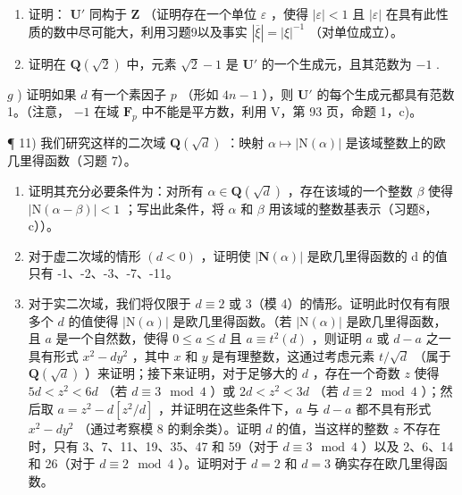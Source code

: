 \begin{enumerate}
\def\labelenumi{\alph{enumi})}
\setcounter{enumi}{4}
\item
  证明： \(\mathbf{U}'\) 同构于 \(\mathbf{Z}\) （证明存在一个单位 \(\varepsilon\) ，使得 \(|\varepsilon| < 1\) 且 \(|\varepsilon|\) 在具有此性质的数中尽可能大，利用习题9以及事实 \(|\overline{\xi}| = |\xi|^{-1}\) （对单位成立）。
\item
  证明在 \(\mathbf{Q}(\sqrt{2})\) 中，元素 \(\sqrt{2} - 1\) 是 \(\mathbf{U}'\) 的一个生成元，且其范数为 \(-1\) .
\end{enumerate}

\(g\) ) 证明如果 \(d\) 有一个素因子 \(p\) （形如 \(4n - 1\) ），则 \(\mathbf{U}'\) 的每个生成元都具有范数 1。（注意， \(-1\) 在域 \(\mathbf{F}_p\) 中不能是平方数，利用 V，第 93 页，命题 1，c)。

¶ 11) 我们研究这样的二次域 \(\mathbf{Q}(\sqrt{d})\) ：映射 \(\alpha \mapsto |\mathrm{N}(\alpha)|\) 是该域整数上的欧几里得函数（习题 7）。

\begin{enumerate}
\def\labelenumi{\alph{enumi})}
\item
  证明其充分必要条件为：对所有 \(\alpha \in \mathbf{Q}(\sqrt{d})\) ，存在该域的一个整数 \(\beta\) 使得 \(|\mathrm{N}(\alpha - \beta)| < 1\) ；写出此条件，将 \(\alpha\) 和 \(\beta\) 用该域的整数基表示（习题8，c））。
\item
  对于虚二次域的情形 \((d < 0)\) ，证明使 \(|\mathbf{N}(\alpha)|\) 是欧几里得函数的 d 的值只有 -1、-2、-3、-7、-11。
\item
  对于实二次域，我们将仅限于 \(d \equiv 2\) 或 3（模 4）的情形。证明此时仅有有限多个 \(d\) 的值使得 \(|\mathrm{N}(\alpha)|\) 是欧几里得函数。（若 \(|\mathrm{N}(\alpha)|\) 是欧几里得函数，且 \(a\) 是一个自然数，使得 \(0 \leqslant a \leqslant d\) 且 \(a \equiv t^2(d)\) ，则证明 \(a\) 或 \(d - a\) 之一具有形式 \(x^2 - dy^2\) ，其中 \(x\) 和 \(y\) 是有理整数，这通过考虑元素 \(t / \sqrt{d}\) （属于 \(\mathbf{Q}(\sqrt{d})\) ）来证明；接下来证明，对于足够大的 \(d\) ，存在一个奇数 \(z\) 使得 \(5d < z^2 < 6d\) （若 \(d \equiv 3 \mod 4\) ）或 \(2d < z^2 < 3d\) （若 \(d \equiv 2 \mod 4\) ）；然后取 \(a = z^2 - d[z^2/d]\) ，并证明在这些条件下，\(a\) 与 \(d - a\) 都不具有形式 \(x^2 - dy^2\) （通过考察模 8 的剩余类）。证明 \(d\) 的值，当这样的整数 \(z\) 不存在时，只有 3、7、11、19、35、47 和 59（对于 \(d \equiv 3 \mod 4\) ）以及 2、6、14 和 26（对于 \(d \equiv 2 \mod 4\) ）。证明对于 \(d = 2\) 和 \(d = 3\) 确实存在欧几里得函数。
\end{enumerate}

